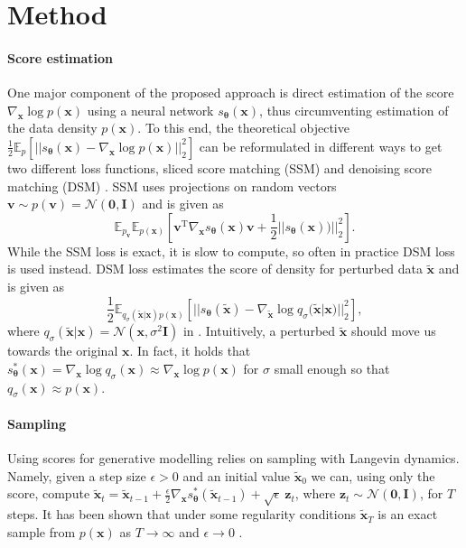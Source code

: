 \section{Method}
\label{sec:method}

\paragraph{Score estimation} \label{score_est} One major component of the proposed approach is direct estimation of the score $\nabla_{\mathbf{x}} \log p(\mathbf{x})$ using a neural network $s_{\bm{\theta}}(\mathbf{x})$, thus circumventing estimation of the data density $p(\mathbf{x})$. To this end, the theoretical objective $\frac{1}{2}\mathbb{E}_p\left[ || s_{\bm{\theta}}(\mathbf{x}) - \nabla_{\mathbf{x}} \log p(\mathbf{x})  ||^2_2 \right]$ can be reformulated in different ways to get two different loss functions, %
sliced score matching (SSM) \citep{ssm} and denoising score matching (DSM) \citep{dsm}. SSM uses projections on random vectors $\mathbf{v} \sim p(\mathbf{v}) = \mathcal{N}(\mathbf{0}, \mathbf{I})$ and is given as
\begin{equation}
\mathbb{E}_{p_{\mathbf{v}}}\mathbb{E}_{p(\mathbf{x})}\left[ \mathbf{v}^{\text{T}}\nabla_{\mathbf{x}}s_{\bm{\theta}}(\mathbf{x})\mathbf{v} + \frac{1}{2}||s_{\bm{\theta}}(\mathbf{x}))||^2_2 \right].
\end{equation}
While the SSM loss is exact, it is slow to compute, so often in practice DSM loss is used instead. DSM loss estimates the score of density for perturbed data $ \mathbf{\tilde x}$ and is given as
\begin{equation}
\frac{1}{2} \mathbb{E}_{q_\sigma ( \mathbf{ \tilde x} | \mathbf{x}) p(\mathbf{x})} \left[ || s_{\bm{\theta}}( \mathbf{ \tilde x}) - \nabla_{\mathbf{\tilde x}} \log q_\sigma( \mathbf{ \tilde x} | \mathbf{x})  ||^2_2  \right],
\end{equation}
where $q_\sigma( \mathbf{ \tilde x} | \mathbf{x}) = \mathcal{N}(\mathbf{x}, \sigma^2\mathbf{I})$ in \cite{ncsn-paper}. Intuitively, a perturbed $\mathbf{\tilde x}$ should move us towards the original $\mathbf{x}$. In fact, it holds that $s^*_{\bm{\theta}}(\mathbf{x})  = \nabla_{\mathbf{x}} \log q_{\sigma} (\mathbf{x}) \approx \nabla_{\mathbf{x}} \log p(\mathbf{x})$ for $\sigma$ small enough so that $q_{\sigma}(\mathbf{x}) \approx p(\mathbf{x})$.

\paragraph{Sampling}\label{sampling} Using scores for generative modelling relies on sampling with Langevin dynamics. Namely, given a step size $\epsilon > 0$ and an initial value $\mathbf{\tilde x}_0$ we can, using only the score, compute $\mathbf{\tilde x}_t = \mathbf{\tilde x}_{t-1} + \frac{\epsilon}{2}\nabla_{\mathbf{x}}s^*_{\bm{\theta}}(\mathbf{\tilde x}_{t-1})  + \sqrt{\epsilon}\ \mathbf{z}_t$, where $\mathbf{z}_t \sim \mathcal{N}(\mathbf{0}, \mathbf{I})$, for $T$ steps. It has been shown that under some regularity conditions $\mathbf{\tilde x}_T$ is an exact sample from $p(\mathbf{x})$ as $T \to \infty$ and $\epsilon \to 0$ \cite{Welling:2011:BLV:3104482.3104568}.


